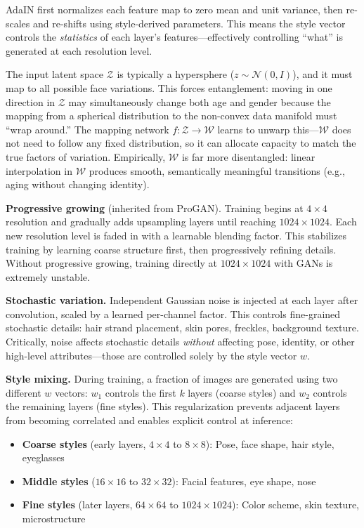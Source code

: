 AdaIN first normalizes each feature map to zero mean and unit variance, then re-scales and re-shifts using style-derived parameters. This means the style vector controls the \textit{statistics} of each layer's features---effectively controlling ``what'' is generated at each resolution level.

\begin{keyinsight}
The input latent space $\mathcal{Z}$ is typically a hypersphere ($z \sim \mathcal{N}(0, I)$), and it must map to all possible face variations. This forces entanglement: moving in one direction in $\mathcal{Z}$ may simultaneously change both age and gender because the mapping from a spherical distribution to the non-convex data manifold must ``wrap around.'' The mapping network $f: \mathcal{Z} \to \mathcal{W}$ learns to unwarp this---$\mathcal{W}$ does not need to follow any fixed distribution, so it can allocate capacity to match the true factors of variation. Empirically, $\mathcal{W}$ is far more disentangled: linear interpolation in $\mathcal{W}$ produces smooth, semantically meaningful transitions (e.g., aging without changing identity).
\end{keyinsight}

\textbf{Progressive growing} (inherited from ProGAN). Training begins at $4 \times 4$ resolution and gradually adds upsampling layers until reaching $1024 \times 1024$. Each new resolution level is faded in with a learnable blending factor. This stabilizes training by learning coarse structure first, then progressively refining details. Without progressive growing, training directly at $1024 \times 1024$ with GANs is extremely unstable.

\textbf{Stochastic variation.} Independent Gaussian noise is injected at each layer after convolution, scaled by a learned per-channel factor. This controls fine-grained stochastic details: hair strand placement, skin pores, freckles, background texture. Critically, noise affects stochastic details \textit{without} affecting pose, identity, or other high-level attributes---those are controlled solely by the style vector $w$.

\textbf{Style mixing.} During training, a fraction of images are generated using two different $w$ vectors: $w_1$ controls the first $k$ layers (coarse styles) and $w_2$ controls the remaining layers (fine styles). This regularization prevents adjacent layers from becoming correlated and enables explicit control at inference:
\begin{itemize}
    \item \textbf{Coarse styles} (early layers, $4 \times 4$ to $8 \times 8$): Pose, face shape, hair style, eyeglasses
    \item \textbf{Middle styles} ($16 \times 16$ to $32 \times 32$): Facial features, eye shape, nose
    \item \textbf{Fine styles} (later layers, $64 \times 64$ to $1024 \times 1024$): Color scheme, skin texture, microstructure
\end{itemize}

